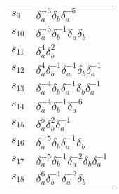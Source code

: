 \documentclass{article}
\begin{document}
\begin{center}
\begin{tabular}{ll}
$s_{9}$ & $\delta_a^{-3}\delta_b^{}\delta_a^{-5}$ \\
$s_{10}$ & $\delta_a^{-3}\delta_b^{-1}\delta_a^{}\delta_b^{}$ \\
$s_{11}$ & $\delta_a^{4}\delta_b^{2}$ \\
$s_{12}$ & $\delta_a^{4}\delta_b^{-1}\delta_a^{-1}\delta_b^{}\delta_a^{-1}$ \\
$s_{13}$ & $\delta_a^{-4}\delta_b^{}\delta_a^{-1}\delta_b^{}\delta_a^{-1}$ \\
$s_{14}$ & $\delta_a^{-4}\delta_b^{-1}\delta_a^{-6}$ \\
$s_{15}$ & $\delta_a^{5}\delta_b^{2}\delta_a^{-1}$ \\
$s_{16}$ & $\delta_a^{-5}\delta_b^{}\delta_a^{-1}\delta_b^{}$ \\
$s_{17}$ & $\delta_a^{-5}\delta_b^{-1}\delta_a^{-2}\delta_b^{}\delta_a^{-1}$ \\
$s_{18}$ & $\delta_a^{6}\delta_b^{-1}\delta_a^{-2}\delta_b^{}$ \\
\bottomrule
\end{tabular}
\end{center}

\thispagestyle{empty}
\end{document}
